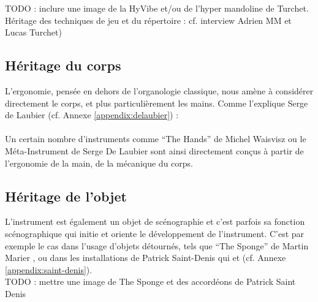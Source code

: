 TODO : inclure une image de la HyVibe et/ou de l'hyper mandoline de Turchet.\\
Héritage des techniques de jeu et du répertoire : cf. interview Adrien MM et Lucas Turchet) 


\subsection{Héritage du corps}
\noindent L'ergonomie, pensée en dehors de l'organologie classique, nous amène à considérer directement le corps, et plus particulièrement les mains. Comme l'explique Serge de Laubier (cf. Annexe \ref{appendix:delaubier}) :\\
\\

Un certain nombre d'instruments comme ``The Hands'' de Michel Waisvisz ou le Méta-Instrument de Serge De Laubier sont ainsi directement conçus à partir de l'ergonomie de la main, de la mécanique du corps.

\subsection{Héritage de l'objet}

\noindent L'instrument est également un objet de scénographie et c'est parfois sa fonction scénographique qui initie et oriente le développement de l'instrument. C'est par exemple le cas dans l'usage d'objets détournés, tels que ``The Sponge'' de Martin Marier \cite{marier_sponge_2010}, ou dans les installations de Patrick Saint-Denis qui  et  (cf. Annexe \ref{appendix:saint-denis}).\\

TODO : mettre une image de The Sponge et des accordéons de Patrick Saint Denis

